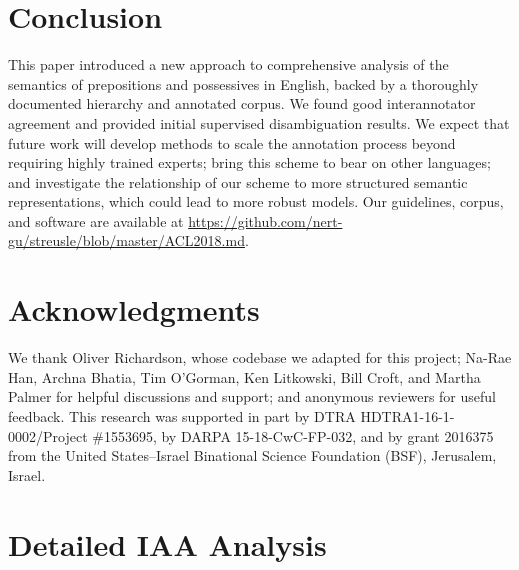 \pdfoutput=1 \documentclass[11pt,a4paper]{article}
\begin{document}
\section{Conclusion}

This paper introduced a new approach to comprehensive analysis of the semantics of prepositions and possessives in English, backed by a thoroughly documented hierarchy and annotated corpus.
We found good interannotator agreement and provided initial supervised disambiguation results.
We expect that future work will develop methods to scale the annotation process beyond requiring highly trained experts;
bring this scheme to bear on other languages; 
and investigate the relationship of our scheme to more structured semantic representations, which could lead to more robust models.
Our guidelines, corpus, and software are available at \url{https://github.com/nert-gu/streusle/blob/master/ACL2018.md}.


\section*{Acknowledgments}

We thank Oliver Richardson, whose codebase we adapted for this project; Na-Rae Han, Archna Bhatia, Tim O'Gorman, Ken Litkowski, Bill Croft, and Martha Palmer for helpful discussions and support; and anonymous reviewers for useful feedback.
This research was supported in part by DTRA HDTRA1-16-1-0002/Project \#1553695, by DARPA 15-18-CwC-FP-032, and by grant 2016375 from the United States--Israel Binational Science Foundation (BSF), Jerusalem, Israel.





\newpage

\phantom{xxxxxxx}

\newpage

\appendix



\section{Detailed IAA Analysis}\label{sec:detailed-iaa}
\end{document}
